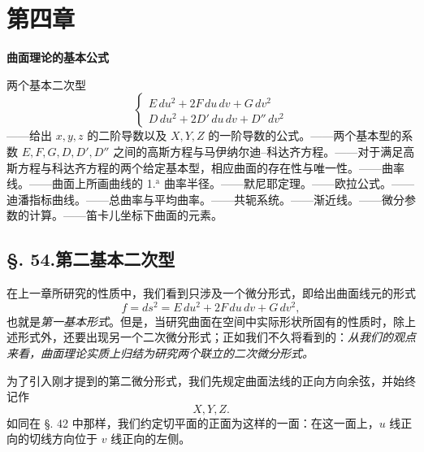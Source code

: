 \section*{第四章}
\begin{center}
{\Large\bfseries 曲面理论的基本公式}
\end{center}

\begin{center}
\small
两个基本二次型
\[
\left\{
\begin{array}{l}
E\,du^2+2F\,du\,dv+G\,dv^2\\
D\,du^2+2D'\,du\,dv+D''\,dv^2
\end{array}
\right.
\]
——给出 \(x,y,z\) 的二阶导数以及 \(X,Y,Z\) 的一阶导数的公式。——两个基本型的系数 \(E,F,G,D,D',D''\) 之间的高斯方程与马伊纳尔迪–科达齐方程。——对于满足高斯方程与科达齐方程的两个给定基本型，相应曲面的存在性与唯一性。——曲率线。——曲面上所画曲线的 1.\({}^{\mathrm a}\) 曲率半径。——默尼耶定理。——欧拉公式。——迪潘指标曲线。——总曲率与平均曲率。——共轭系统。——渐近线。——微分参数的计算。——笛卡儿坐标下曲面的元素。
\end{center}

\subsection*{\S. 54.\quad 第二基本二次型}

在上一章所研究的性质中，我们看到只涉及一个微分形式，即给出曲面线元的形式
\[
 f=ds^2=E\,du^2+2F\,du\,dv+G\,dv^2,
\]
也就是\emph{第一基本形式}。但是，当研究曲面在空间中实际形状所固有的性质时，除上述形式外，还要出现另一个二次微分形式；正如我们不久将看到的：\emph{从我们的观点来看，曲面理论实质上归结为研究两个联立的二次微分形式。}

为了引入刚才提到的第二微分形式，我们先规定曲面法线的正向方向余弦，并始终记作
\[
 X,Y,Z.
\]
如同在 \S. 42 中那样，我们约定切平面的正面为这样的一面：在这一面上，\(u\) 线正向的切线方向位于 \(v\) 线正向的左侧。

